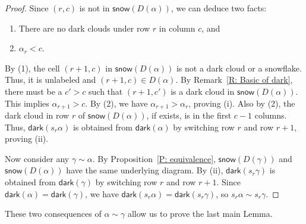 \documentclass[10pt]{amsart}
\theoremstyle{plain}
\theoremstyle{plain}
\theoremstyle{definition}
\theoremstyle{definition}
\theoremstyle{definition}
\theoremstyle{plain}
\theoremstyle{plain}
\theoremstyle{plain}
\theoremstyle{plain}
\theoremstyle{plain}
\theoremstyle{remark}
\theoremstyle{remark}
\theoremstyle{plain}
\theoremstyle{plain}
\newcommand{\dark}{\mathsf{dark}}
\newcommand{\snow}{\mathsf{snow}}
\begin{document}
\begin{proof}
Since $(r,c)$ is not in $\snow(D(\alpha))$,
we can deduce two facts:
\begin{enumerate}
\item There are no dark clouds under row $r$ in column $c$, and 
\item $\alpha_r < c$.
\end{enumerate}

By (1), the cell $(r+1,c)$ in $\snow(D(\alpha))$ 
is not a dark cloud or a snowflake.
Thus, it is unlabeled and $(r+1,c) \in D(\alpha)$.
By Remark~\ref{R: Basic of dark},
there must be a $c' > c$
such that $(r+1, c')$ is a dark cloud 
in $\snow(D(\alpha))$.
This implies $\alpha_{r+1} > c$.
By (2), 
we have $\alpha_{r+1} > \alpha_r$, 
proving (i).
Also by (2), 
the dark cloud in row $r$ of 
$\snow(D(\alpha))$,
if exists, 
is in the first $c-1$ columns. 
Thus, $\dark(s_r\alpha)$ is obtained
from $\dark(\alpha)$ by switching 
row $r$ and row $r+1$, proving (ii).

Now consider any  $\gamma \sim \alpha$.
By Proposition~\ref{P: equivalence},
$\snow(D(\gamma))$ and $\snow(D(\alpha))$
have the same underlying diagram.
By (ii), 
$\dark(s_r\gamma)$ is obtained
from $\dark(\gamma)$ by switching 
row $r$ and row $r+1$.
Since $\dark(\alpha) = \dark(\gamma)$,
we have $\dark(s_r\alpha) = \dark(s_r\gamma)$,
so $s_r \alpha \sim s_r \gamma$.
\end{proof}


These two consequences of $\alpha \sim \gamma$
allow us to prove the last main Lemma. 
\end{document}
